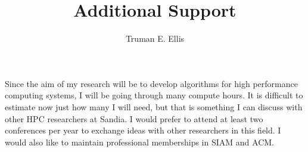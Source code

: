 \documentclass[letterpaper,12pt]{article}
\title{Additional Support}
\author{Truman E. Ellis}
\date{}
\begin{document}
\maketitle
Since the aim of my research will be to develop algorithms for high performance computing systems, 
I will be going through many compute hours. 
It is difficult to estimate now just how many I will need, but that is something I can discuss with other HPC researchers at Sandia.
I would prefer to attend at least two conferences per year to exchange ideas with other researchers in this field.
I would also like to maintain professional memberships in SIAM and ACM.
\end{document}
